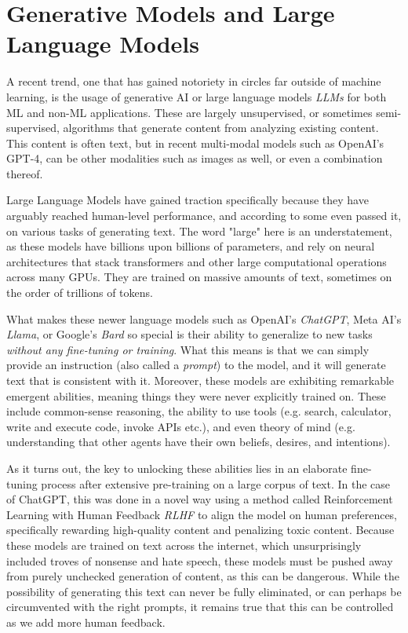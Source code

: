 
\section{Generative Models and Large Language Models}

A recent trend, one that has gained notoriety in circles far outside of machine learning, is the usage of generative AI
or large language models \textit{LLMs} for both ML and non-ML applications. These are largely unsupervised, or sometimes
semi-supervised, algorithms that generate content from analyzing existing content. This content is often text, but in recent
multi-modal models such as OpenAI's GPT-4\cite{openai2023gpt4}, can be other modalities such as images as well, or even a combination thereof.

Large Language Models have gained traction specifically because they have arguably reached human-level performance, and according
to some even passed it, on various tasks of generating text. The word "large" here is an understatement,
as these models have billions upon billions of parameters, and rely on neural architectures that stack transformers and other large
computational operations across many GPUs. They are trained on massive amounts of text, sometimes on the order of trillions\cite{touvron2023llama} of tokens.

What makes these newer language models such as OpenAI's \textit{ChatGPT}, Meta AI's \textit{Llama}\cite{touvron2023llama}, or Google's \textit{Bard} so special is their ability to generalize to new tasks \textit{without any fine-tuning or training}.
What this means is that we can simply provide an instruction (also called a \textit{prompt}) to the model, and it will generate text that is consistent with it.
Moreover, these models are exhibiting remarkable emergent abilities, meaning things they were never explicitly trained on.
These include common-sense reasoning, the ability to use tools (e.g. search, calculator, write and execute code, invoke APIs etc.), and even theory of mind (e.g. understanding that other agents have their own beliefs, desires, and intentions)\cite{bubeck2023sparks,openai2023gpt4}.

As it turns out, the key to unlocking these abilities lies in an elaborate fine-tuning process after extensive pre-training on a large corpus of text.
In the case of ChatGPT, this was done in a novel way using a method called Reinforcement Learning with Human Feedback \textit{RLHF} to align the model on human preferences, specifically
rewarding high-quality content and penalizing toxic content.\cite{ouyang2022training} Because these models are trained on text across the internet, which
unsurprisingly included troves of nonsense and hate speech, these models must be pushed away from purely unchecked generation of content,
as this can be dangerous. While the possibility of generating this text can never be fully eliminated, or can perhaps be circumvented with the right prompts, it remains true that this can be controlled as we add more human feedback.

